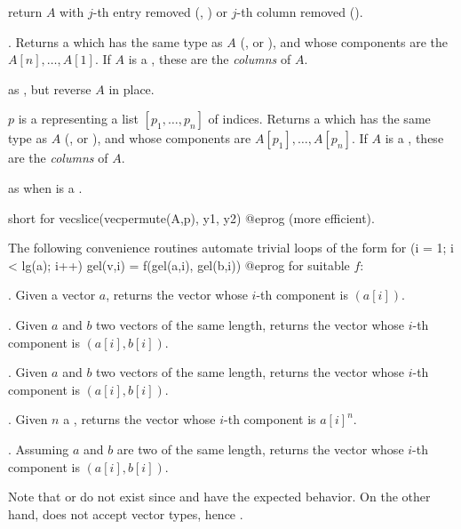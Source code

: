  return $A$ with $j$-th entry removed
(, ) or $j$-th column removed ().

. Returns a  which has the same
type as $A$ (,  or ), and whose components
are the $A[n],\dots,A[1]$. If $A$ is a , these are the
\emph{columns} of $A$.

 as , but reverse
$A$ in place.

 $p$ is a  representing
a list $[p_1,\dots,p_n]$ of indices. Returns a  which has the same
type as $A$ (,  or ), and whose components
are $A[p_1],\dots,A[p_n]$. If $A$ is a , these are the
\emph{columns} of $A$.

 as  when  is a
.

 short for
\bprog
  vecslice(vecpermute(A,p), y1, y2)
@eprog\noindent
(more efficient).


The following convenience routines automate trivial loops of the form
\bprog
  for (i = 1; i < lg(a); i++) gel(v,i) = f(gel(a,i), gel(b,i))
@eprog\noindent
for suitable $f$:

. Given a vector $a$,
returns the vector whose $i$-th component is $(a[i])$.

. Given $a$ and $b$ two vectors of the same
length, returns the vector whose $i$-th component is $(a[i], b[i])$.

. Given $a$ and $b$ two vectors of the same
length, returns the vector whose $i$-th component is $(a[i], b[i])$.

. Given $n$ a , returns
the vector whose $i$-th component is $a[i]^n$.

. Assuming $a$ and $b$ are two 
of the same length, returns the vector whose $i$-th component
is $(a[i], b[i])$.

Note that  or  do not exist since 
and  have the expected behavior. On the other hand,
 does not accept vector types, hence .

